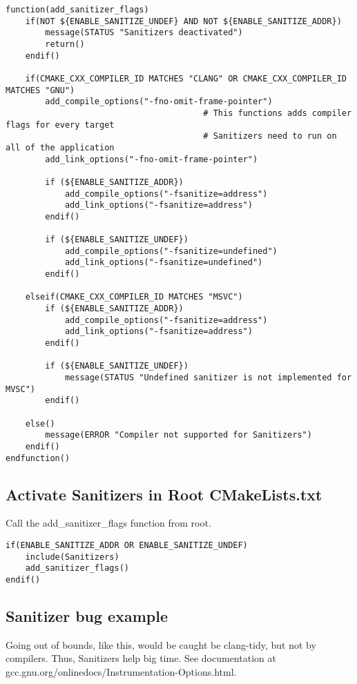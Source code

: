 \documentclass[openany]{report}
\begin{document}
\begin{verbatim}
function(add_sanitizer_flags)
    if(NOT ${ENABLE_SANITIZE_UNDEF} AND NOT ${ENABLE_SANITIZE_ADDR})
        message(STATUS "Sanitizers deactivated") 
        return()
    endif()

    if(CMAKE_CXX_COMPILER_ID MATCHES "CLANG" OR CMAKE_CXX_COMPILER_ID MATCHES "GNU")
        add_compile_options("-fno-omit-frame-pointer")   
                                        # This functions adds compiler flags for every target
                                        # Sanitizers need to run on all of the application
        add_link_options("-fno-omit-frame-pointer")

        if (${ENABLE_SANITIZE_ADDR})
            add_compile_options("-fsanitize=address") 
            add_link_options("-fsanitize=address") 
        endif()

        if (${ENABLE_SANITIZE_UNDEF})
            add_compile_options("-fsanitize=undefined") 
            add_link_options("-fsanitize=undefined") 
        endif()

    elseif(CMAKE_CXX_COMPILER_ID MATCHES "MSVC")
        if (${ENABLE_SANITIZE_ADDR})
            add_compile_options("-fsanitize=address") 
            add_link_options("-fsanitize=address") 
        endif()

        if (${ENABLE_SANITIZE_UNDEF})
            message(STATUS "Undefined sanitizer is not implemented for MVSC")
        endif()

    else() 
        message(ERROR "Compiler not supported for Sanitizers")
    endif()
endfunction()
\end{verbatim}


\subsection{Activate Sanitizers in Root CMakeLists.txt}

Call the add\_sanitizer\_flags function from root.

\begin{verbatim}
if(ENABLE_SANITIZE_ADDR OR ENABLE_SANITIZE_UNDEF)
    include(Sanitizers)
    add_sanitizer_flags()
endif()
\end{verbatim}

\subsection{Sanitizer bug example}

Going out of bounds, like this, would be caught be clang-tidy, but not by compilers. Thus, Sanitizers help big time. See documentation at
gcc.gnu.org/onlinedocs/Instrumentation-Options.html.
\end{document}
